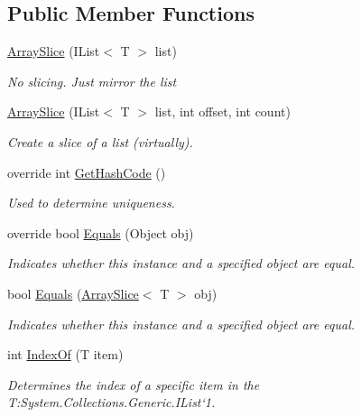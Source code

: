 \subsection*{Public Member Functions}
\begin{DoxyCompactItemize}
\item 
\hyperlink{struct_shared_memory_1_1_utilities_1_1_array_slice_a8c44c8e9338aa36a7feb4d4c69a920a6}{Array\+Slice} (I\+List$<$ T $>$ list)
\begin{DoxyCompactList}\small\item\em No slicing. Just mirror the list \end{DoxyCompactList}\item 
\hyperlink{struct_shared_memory_1_1_utilities_1_1_array_slice_a85fa170c17d7075195df377777c80e24}{Array\+Slice} (I\+List$<$ T $>$ list, int offset, int count)
\begin{DoxyCompactList}\small\item\em Create a slice of a list (virtually). \end{DoxyCompactList}\item 
override int \hyperlink{struct_shared_memory_1_1_utilities_1_1_array_slice_ad8cb15c9d677eeaac9f7e3b9412e8208}{Get\+Hash\+Code} ()
\begin{DoxyCompactList}\small\item\em Used to determine uniqueness. \end{DoxyCompactList}\item 
override bool \hyperlink{struct_shared_memory_1_1_utilities_1_1_array_slice_a21582c7493c0489a58c867236724a1aa}{Equals} (Object obj)
\begin{DoxyCompactList}\small\item\em Indicates whether this instance and a specified object are equal.\end{DoxyCompactList}\item 
bool \hyperlink{struct_shared_memory_1_1_utilities_1_1_array_slice_a0a70e0cbe83928a24c41b387bfc7fa03}{Equals} (\hyperlink{struct_shared_memory_1_1_utilities_1_1_array_slice}{Array\+Slice}$<$ T $>$ obj)
\begin{DoxyCompactList}\small\item\em Indicates whether this instance and a specified object are equal.\end{DoxyCompactList}\item 
int \hyperlink{struct_shared_memory_1_1_utilities_1_1_array_slice_a5bd173322ca59e43b6d22fbabbd49195}{Index\+Of} (T item)
\begin{DoxyCompactList}\small\item\em Determines the index of a specific item in the T\+:\+System.\+Collections.\+Generic.\+I\+List`1.\end{DoxyCompactList}\item 

\end{DoxyCompactItemize}

